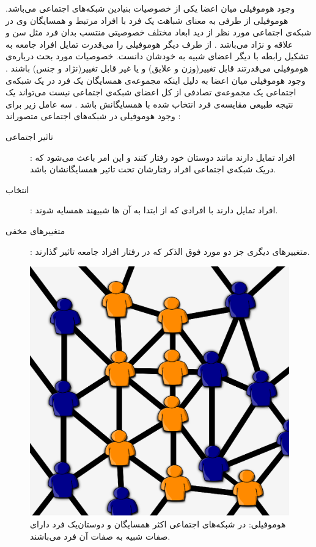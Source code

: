 \begin {persian}
\noindent
وجود هوموفیلی میان اعضا ‌یکی از خصوصیات بنیادین شبکه‌های اجتماعی می‌باشد. هوموفیلی از طرفی به معنای شباهت ‌یک فرد با افراد مرتبط و همسایگان وی در شبکه‌ی اجتماعی مورد نظر از دید ابعاد مختلف خصوصیتی منتسب بدان فرد مثل سن و علاقه و نژاد می‌باشد \cite{sun_survey_2011}. از طرف دیگر هوموفیلی را می‌قدرت تمایل افراد جامعه به تشکیل رابطه با دیگر اعضای‌ شبیه به خودشان دانست. خصوصیات مورد بحث درباره‌ی هوموفیلی می‌قدرتند قابل تغییر(وزن و علایق) و‌ یا غیر قابل تغییر(نژاد و جنس) باشند \cite{easley_networks_2010}. وجود هوموفیلی میان اعضا به دلیل اینکه مجموعه‌ی همسایگان ‌یک فرد در ‌یک شبکه‌ی اجتماعی‌ یک مجموعه‌ی تصادفی از کل اعضای شبکه‌ی اجتماعی نیست می‌تواند ‌یک نتیجه طبیعی مقایسه‌ی فرد انتخاب شده با همسایگانش باشد \cite{sun_survey_2011}.
سه عامل زیر برای وجود هوموفیلی در شبکه‌های اجتماعی متصوراند \cite{sun_survey_2011}:

\begin{description}

\item[{تاثیر اجتماعی}]{: افراد تمایل دارند مانند دوستان خود رفتار کنند و این امر باعث می‌شود که در‌یک شبکه‌ی اجتماعی افراد رفتارشان تحت تاثیر همسایگانشان باشد.}

\item[انتخاب]{: افراد تمایل دارند با افرادی که از ابتدا به آن ‌‌ها شبیهند همسایه شوند.}
 
\item[متغییر‌های مخفی]{: متغییر‌های دیگری جز دو مورد فوق الذکر که در رفتار افراد جامعه تاثیر گذارند.}
 
\end{description}

 \begin{figure}[H]
 \centering
 \includegraphics[scale=0.5]{figures/homophily1}
 \caption[هوموفیلی]
 {هوموفیلی: در شبکه‌های اجتماعی اکثر همسایگان و دوستان‌یک فرد دارای صفات شبیه به صفات آن فرد می‌باشند.}
\end{figure}


\end{persian}
